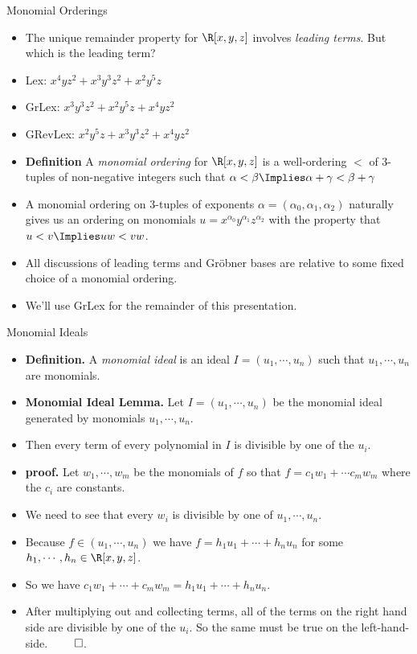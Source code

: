 \documentclass{beamer}
\begin{document}
\begin{frame}{Monomial Orderings}

\begin{itemize}
  \item The unique remainder property for $\R[x,y,z]$ involves \emph{leading terms}. But which is the leading term?
  \item Lex: $x^4yz^2 + x^3y^3z^2 + x^2y^5z$
  \item GrLex: $x^3y^3z^2 + x^2y^5z + x^4yz^2$
  \item GRevLex: $x^2y^5z +x^3y^3z^2 +  x^4yz^2$
  \item \textbf{Definition} A \emph{monomial ordering} for $\R[x,y,z]$ is a
  well-ordering $<$ of 3-tuples of non-negative integers such that $\alpha < \beta \Implies \alpha + \gamma < \beta + \gamma$
  \item A monomial ordering on 3-tuples of exponents $\alpha=(\alpha_0,\alpha_1,\alpha_2)$ naturally gives us an ordering on
  monomials $u = x^{\alpha_0}y^{\alpha_1}z^{\alpha_2}$ with the property that $u<v \Implies uw < vw$.
  \item All discussions of leading terms and Gr\"{o}bner bases are relative to some fixed choice of a monomial ordering.
  \item We'll use GrLex for the remainder of this presentation.
\end{itemize}

\end{frame}

\begin{frame}{Monomial Ideals}

\begin{itemize}
  \item \textbf{Definition.} A \emph{monomial ideal} is an ideal $I=(u_1,\cdots, u_n)$ such that $u_1,\cdots,u_n$ are monomials.
  \item \textbf{Monomial Ideal Lemma.} Let $I=(u_1,\cdots, u_n)$ be the monomial ideal generated by monomials $u_1,\cdots,u_n$.
  \item Then every term of every polynomial in $I$ is divisible by one of the $u_i$.
  \item \textbf{proof.}  Let $w_1,\cdots,w_m$ be the monomials of $f$ so that $f=c_1w_1 + \cdots c_m w_m$ where the $c_i$ are constants.
  \item We need to see that every $w_i$ is divisible by one of $u_1,\cdots,u_n$.
  \item Because $f\in (u_1,\cdots, u_n)$ we have $f=h_1u_1 + \cdots + h_n u_n$ for some $h_1,\cdots,h_n\in\R[x,y,z]$.
  \item So we have $c_1w_1 + \cdots + c_m w_m = h_1u_1 + \cdots + h_n u_n$.
  \item After multiplying out and collecting terms, all of the terms on the right hand side are divisible by one of the $u_i$.
  So the same must be true on the left-hand-side. $\qed$.
\end{itemize}

\end{frame}
\end{document}
